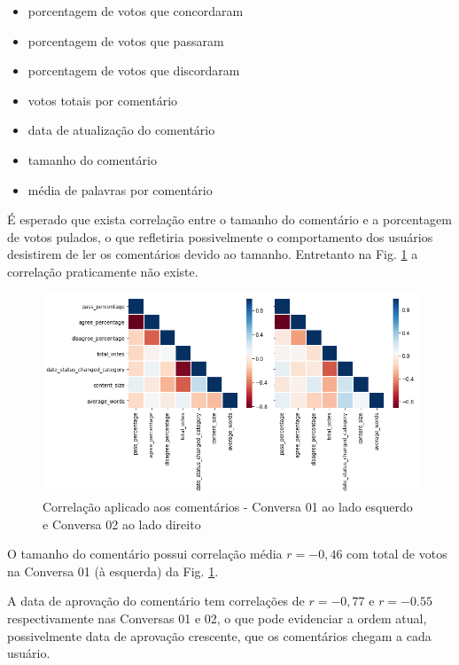 

\begin{itemize}
\item porcentagem de votos que concordaram
\item porcentagem de votos que passaram
\item porcentagem de votos que discordaram 
\item votos totais por comentário
\item data de atualização do comentário
\item tamanho do comentário
\item média de palavras por comentário

\end{itemize}



É esperado que exista correlação entre o tamanho do comentário e a porcentagem de votos pulados, o que refletiria possivelmente o comportamento dos usuários desistirem de ler os comentários devido ao tamanho. Entretanto na Fig. \ref{fig:compara-corr-comentarios} a correlação praticamente não existe. 

\begin{figure}[!h]
	\centering
	\includegraphics[keepaspectratio=true,scale=0.58]{figuras/tcc2/cluster-comentario/corr-comentario-conversa2.png}
	\caption{Correlação aplicado aos comentários - Conversa 01 ao lado esquerdo e Conversa 02 ao lado direito}
	\label{fig:compara-corr-comentarios}
\end{figure}

O tamanho do comentário possui correlação média $r=-0,46$ com total de votos na Conversa 01 (à esquerda) da Fig. \ref{fig:compara-corr-comentarios}.

A data de aprovação do comentário tem correlações de $r=-0,77$ e $r=-0.55$ respectivamente nas Conversas 01 e 02, 
o que pode evidenciar a ordem atual, possivelmente data de aprovação crescente, que os comentários chegam a cada usuário.


